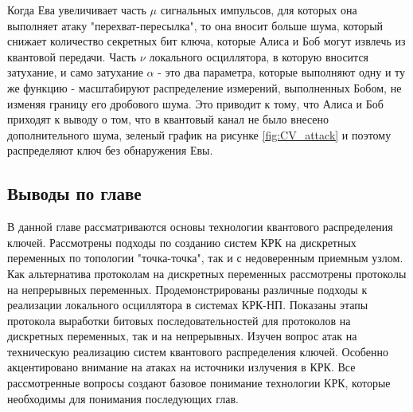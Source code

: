 Когда Ева увеличивает часть $\mu$ сигнальных импульсов, для которых она выполняет атаку "перехват-пересылка", то она вносит больше шума, который снижает количество секретных бит ключа, которые Алиса и Боб могут извлечь из квантовой передачи.
Часть $\nu$ локального осциллятора, в которую вносится затухание, и само затухание $\alpha$ - это два параметра, которые выполняют одну и ту же функцию - масштабируют распределение измерений, выполненных Бобом, не изменяя границу его дробового шума. Это приводит к тому, что Алиса и Боб приходят к выводу о том, что в квантовый канал не было внесено дополнительного шума, зеленый график на рисунке \ref*{fig:CV_attack} и поэтому распределяют ключ без обнаружения Евы.


\subsection{Выводы по главе}\label{sec:ch1/sect8}
В данной главе рассматриваются основы технологии квантового распределения ключей. Рассмотрены подходы по созданию систем КРК на дискретных переменных по топологии "точка-точка", так и с недоверенным приемным узлом. Как альтернатива протоколам на дискретных переменных рассмотрены протоколы на непрерывных переменных. Продемонстрированы  различные подходы к реализации локального осциллятора в системах КРК-НП. Показаны этапы протокола выработки битовых последовательностей для протоколов на дискретных переменных, так и на непрерывных.
Изучен вопрос атак на техническую реализацию систем квантового распределения ключей. Особенно акцентировано внимание на атаках на источники излучения в КРК. Все рассмотренные вопросы создают базовое понимание технологии КРК, которые необходимы для понимания последующих глав.